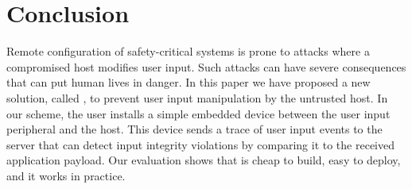 
\section{Conclusion}
\label{sec:conclusion}

Remote configuration of safety-critical systems is prone to attacks where a compromised host modifies user input. Such attacks can have severe consequences that can put human lives in danger. In this paper we have proposed a new solution, called \name, to prevent user input manipulation by the untrusted host. In our scheme, the user installs a simple embedded device between the user input peripheral and the host. This device sends a trace of user input events to the server that can detect input integrity violations by comparing it to the received application payload. Our evaluation shows that \name is cheap to build, easy to deploy, and it works in practice.


